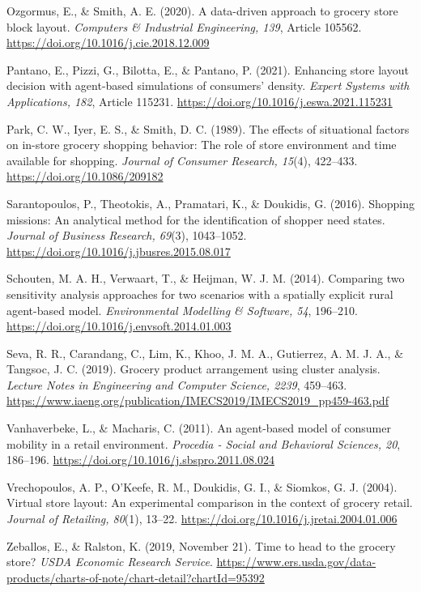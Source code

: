 \documentclass[12pt]{article}
\newcommand{\aparef}[1]{\par\noindent\hangindent=0.5in\hangafter=1 #1\par}
\begin{document}
\aparef{Ozgormus, E., \& Smith, A. E. (2020). A data-driven approach to grocery store block layout. \textit{Computers \& Industrial Engineering, 139}, Article 105562. \url{https://doi.org/10.1016/j.cie.2018.12.009}}

\aparef{Pantano, E., Pizzi, G., Bilotta, E., \& Pantano, P. (2021). Enhancing store layout decision with agent-based simulations of consumers' density. \textit{Expert Systems with Applications, 182}, Article 115231. \url{https://doi.org/10.1016/j.eswa.2021.115231}}

\aparef{Park, C. W., Iyer, E. S., \& Smith, D. C. (1989). The effects of situational factors on in-store grocery shopping behavior: The role of store environment and time available for shopping. \textit{Journal of Consumer Research, 15}(4), 422--433. \url{https://doi.org/10.1086/209182}}

\aparef{Sarantopoulos, P., Theotokis, A., Pramatari, K., \& Doukidis, G. (2016). Shopping missions: An analytical method for the identification of shopper need states. \textit{Journal of Business Research, 69}(3), 1043--1052. \url{https://doi.org/10.1016/j.jbusres.2015.08.017}}

\aparef{Schouten, M. A. H., Verwaart, T., \& Heijman, W. J. M. (2014). Comparing two sensitivity analysis approaches for two scenarios with a spatially explicit rural agent-based model. \textit{Environmental Modelling \& Software, 54}, 196--210. \url{https://doi.org/10.1016/j.envsoft.2014.01.003}}

\aparef{Seva, R. R., Carandang, C., Lim, K., Khoo, J. M. A., Gutierrez, A. M. J. A., \& Tangsoc, J. C. (2019). Grocery product arrangement using cluster analysis. \textit{Lecture Notes in Engineering and Computer Science, 2239}, 459--463. \url{https://www.iaeng.org/publication/IMECS2019/IMECS2019_pp459-463.pdf}}

\aparef{Vanhaverbeke, L., \& Macharis, C. (2011). An agent-based model of consumer mobility in a retail environment. \textit{Procedia - Social and Behavioral Sciences, 20}, 186--196. \url{https://doi.org/10.1016/j.sbspro.2011.08.024}}

\aparef{Vrechopoulos, A. P., O'Keefe, R. M., Doukidis, G. I., \& Siomkos, G. J. (2004). Virtual store layout: An experimental comparison in the context of grocery retail. \textit{Journal of Retailing, 80}(1), 13--22. \url{https://doi.org/10.1016/j.jretai.2004.01.006}}

\aparef{Zeballos, E., \& Ralston, K. (2019, November 21). Time to head to the grocery store? \textit{USDA Economic Research Service}. \url{https://www.ers.usda.gov/data-products/charts-of-note/chart-detail?chartId=95392}}
\end{document}
